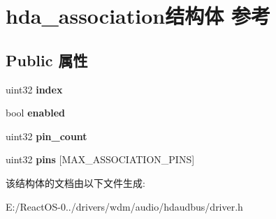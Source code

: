 \hypertarget{structhda__association}{}\section{hda\+\_\+association结构体 参考}
\label{structhda__association}
\subsection*{Public 属性}
\begin{DoxyCompactItemize}
\item 
\mbox{\label{structhda__association_ad17d11fac8ef60ed66ecbd0e5c97d75b}} 
uint32 {\bfseries index}
\item 
\mbox{\label{structhda__association_a92641a77908502c85a5f3de5933d104b}} 
bool {\bfseries enabled}
\item 
\mbox{\label{structhda__association_a9983c3daa435d3f2a4588ddda97ba0c8}} 
uint32 {\bfseries pin\+\_\+count}
\item 
\mbox{\label{structhda__association_ab447a01ea8c1ca8f49b942d3b5f74e0b}} 
uint32 {\bfseries pins} \mbox{[}M\+A\+X\+\_\+\+A\+S\+S\+O\+C\+I\+A\+T\+I\+O\+N\+\_\+\+P\+I\+NS\mbox{]}
\end{DoxyCompactItemize}


该结构体的文档由以下文件生成\+:\begin{DoxyCompactItemize}
\item 
E\+:/\+React\+O\+S-\/0../drivers/wdm/audio/hdaudbus/driver.\+h\end{DoxyCompactItemize}
